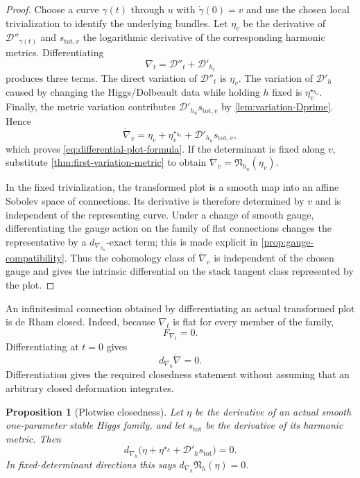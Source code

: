\documentclass[11pt,reqno]{amsart}
\newtheorem{proposition}[theorem]{Proposition}
\theoremstyle{definition}
\theoremstyle{remark}
\newcommand{\cD}{\mathcal D}
\begin{document}
\begin{proof}
Choose a curve $\gamma(t)$ through $u$ with $\dot\gamma(0)=v$ and use the chosen local trivialization to identify the underlying bundles.  Let $\eta_v$ be the derivative of $\cD''_{\gamma(t)}$ and $s_{\mathrm{tot},v}$ the logarithmic derivative of the corresponding harmonic metrics.  Differentiating
\[
  \nabla_t=\cD''_t+\cD'_{h_t}
\]
produces three terms.  The direct variation of $\cD''_t$ is $\eta_v$.  The variation of $\cD'_h$ caused by changing the Higgs/Dolbeault data while holding $h$ fixed is $\eta_v^{\star_{h_u}}$.  Finally, the metric variation contributes $\cD'_{h_u}s_{\mathrm{tot},v}$ by \cref{lem:variation-Dprime}.  Hence
\[
  \dot\nabla_v
  =\eta_v+\eta_v^{\star_{h_u}}
   +\cD'_{h_u}s_{\mathrm{tot},v},
\]
which proves \eqref{eq:differential-plot-formula}.  If the determinant is fixed along $v$, substitute \cref{thm:first-variation-metric} to obtain $\dot\nabla_v=\mathfrak N_{h_u}(\eta_v)$.

In the fixed trivialization, the transformed plot is a smooth map into an affine Sobolev space of connections.  Its derivative is therefore determined by $v$ and is independent of the representing curve.  Under a change of smooth gauge, differentiating the gauge action on the family of flat connections changes the representative by a $d_{\nabla_{h_u}}$-exact term; this is made explicit in \cref{prop:gauge-compatibility}.  Thus the cohomology class of $\dot\nabla_v$ is independent of the chosen gauge and gives the intrinsic differential on the stack tangent class represented by the plot.
\end{proof}


An infinitesimal connection obtained by differentiating an actual
transformed plot is de Rham closed.  Indeed, because $\nabla_t$ is flat
for every member of the family,
\[
  F_{\nabla_t}=0.
\]
Differentiating at $t=0$ gives
\begin{equation}\label{eq:flat-linearized}
  d_{\nabla_h}\dot\nabla=0.
\end{equation}
Differentiation gives the required closedness statement without assuming that an arbitrary closed deformation integrates.

\begin{proposition}[Plotwise closedness]\label{prop:complex-level-closedness}
Let $\eta$ be the derivative of an actual smooth one-parameter stable Higgs family, and let $s_{\mathrm{tot}}$ be the derivative of its harmonic metric.  Then
\[
  d_{\nabla_h}
  \bigl(\eta+\eta^{\star_h}+\cD'_hs_{\mathrm{tot}}\bigr)=0.
\]
In fixed-determinant directions this says $d_{\nabla_h}\mathfrak N_h(\eta)=0$.
\end{proposition}
\end{document}
